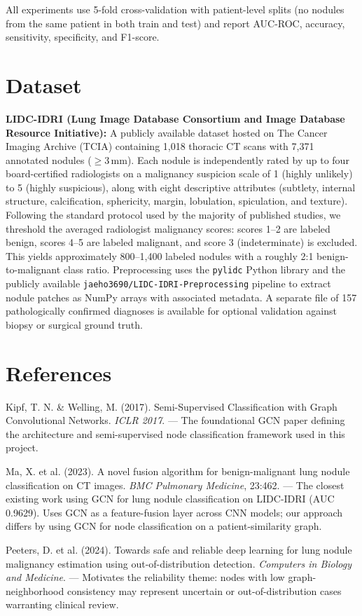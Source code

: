 \documentclass[12pt]{article}
\begin{document}
All experiments use 5-fold cross-validation with patient-level splits (no nodules from the same patient in both train and test) and report AUC-ROC, accuracy, sensitivity, specificity, and F1-score.

\section*{Dataset}

\textbf{LIDC-IDRI (Lung Image Database Consortium and Image Database Resource Initiative):} A publicly available dataset hosted on The Cancer Imaging Archive (TCIA) containing 1,018 thoracic CT scans with 7,371 annotated nodules ($\geq$3\,mm). Each nodule is independently rated by up to four board-certified radiologists on a malignancy suspicion scale of 1 (highly unlikely) to 5 (highly suspicious), along with eight descriptive attributes (subtlety, internal structure, calcification, sphericity, margin, lobulation, spiculation, and texture). Following the standard protocol used by the majority of published studies, we threshold the averaged radiologist malignancy scores: scores 1--2 are labeled benign, scores 4--5 are labeled malignant, and score 3 (indeterminate) is excluded. This yields approximately 800--1,400 labeled nodules with a roughly 2:1 benign-to-malignant class ratio. Preprocessing uses the \texttt{pylidc} Python library and the publicly available \texttt{jaeho3690/LIDC-IDRI-Preprocessing} pipeline to extract nodule patches as NumPy arrays with associated metadata. A separate file of 157 pathologically confirmed diagnoses is available for optional validation against biopsy or surgical ground truth.

\section*{References}

\begin{enumerate}[label={[\arabic*]}]
    \item Kipf, T. N. \& Welling, M. (2017). Semi-Supervised Classification with Graph Convolutional Networks. \textit{ICLR 2017}. --- The foundational GCN paper defining the architecture and semi-supervised node classification framework used in this project.
    \item Ma, X. et al. (2023). A novel fusion algorithm for benign-malignant lung nodule classification on CT images. \textit{BMC Pulmonary Medicine}, 23:462. --- The closest existing work using GCN for lung nodule classification on LIDC-IDRI (AUC 0.9629). Uses GCN as a feature-fusion layer across CNN models; our approach differs by using GCN for node classification on a patient-similarity graph.
    \item Peeters, D. et al. (2024). Towards safe and reliable deep learning for lung nodule malignancy estimation using out-of-distribution detection. \textit{Computers in Biology and Medicine}. --- Motivates the reliability theme: nodes with low graph-neighborhood consistency may represent uncertain or out-of-distribution cases warranting clinical review.
\end{enumerate}
\end{document}
